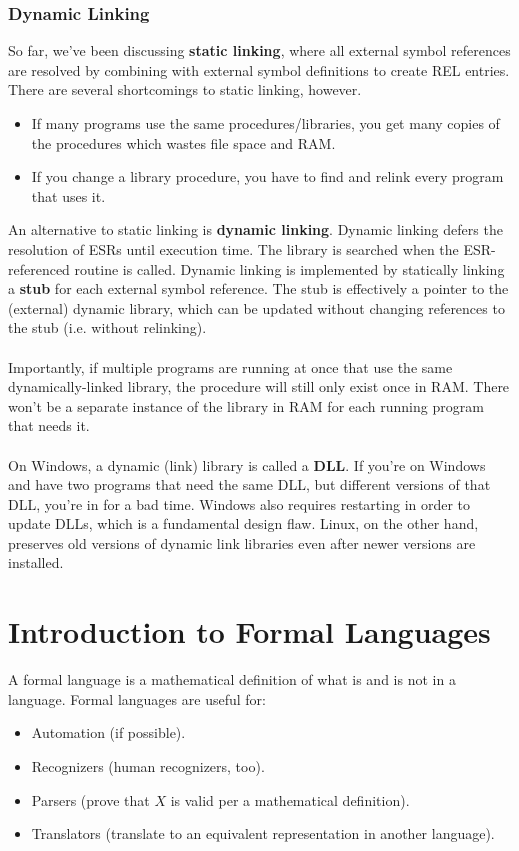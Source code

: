 \documentclass[]{article}
\theoremstyle{definition}
\begin{document}
				\subsubsection{Dynamic Linking}
					So far, we've been discussing \textbf{static linking}, where all external symbol references are resolved by combining with external symbol definitions to create REL entries. There are several shortcomings to static linking, however.
					\begin{itemize}
						\item If many programs use the same procedures/libraries, you get many copies of the procedures which wastes file space and RAM.
						\item If you change a library procedure, you have to find and relink every program that uses it.
					\end{itemize}
					An alternative to static linking is \textbf{dynamic linking}. Dynamic linking defers the resolution of ESRs until execution time. The library is searched when the ESR-referenced routine is called. Dynamic linking is implemented by statically linking a \textbf{stub} for each external symbol reference. The stub is effectively a pointer to the (external) dynamic library, which can be updated without changing references to the stub (i.e. without relinking). 
					\\ \\
					Importantly, if multiple programs are running at once that use the same dynamically-linked library, the procedure will still only exist once in RAM. There won't be a separate instance of the library in RAM for each running program that needs it.
					\\ \\
					On Windows, a dynamic (link) library is called a \textbf{DLL}. If you're on Windows and have two programs that need the same DLL, but different versions of that DLL, you're in for a bad time. Windows also requires restarting in order to update DLLs, which is a fundamental design flaw. Linux, on the other hand, preserves old versions of dynamic link libraries even after newer versions are installed.
	\section{Introduction to Formal Languages}
		A formal language is a mathematical definition of what is and is not in a language. Formal languages are useful for:
		\begin{itemize}
			\item Automation (if possible).
			\item Recognizers (human recognizers, too).
			\item Parsers (prove that $X$ is valid per a mathematical definition).
			\item Translators (translate to an equivalent representation in another language).
		\end{itemize}
\end{document}
